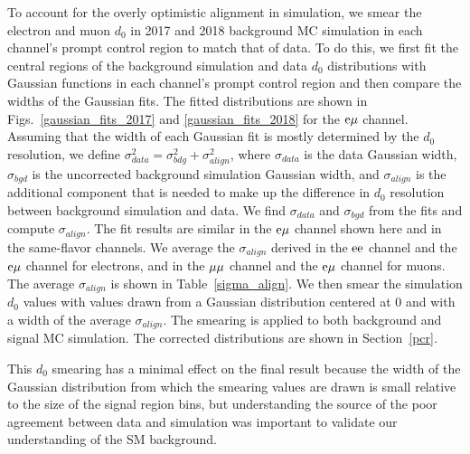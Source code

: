 To account for the overly optimistic alignment in simulation, we smear the electron and muon $d_0$ in 2017 and 2018 background MC simulation in each channel's prompt control region to match that of data. To do this, we first fit the central regions of the background simulation and data $d_0$ distributions with Gaussian functions in each channel's prompt control region and then compare the widths of the Gaussian fits. The fitted distributions are shown in Figs.~\ref{gaussian_fits_2017} and \ref{gaussian_fits_2018} for the $\mathrm{e}{\mu}$ channel. Assuming that the width of each Gaussian fit is mostly determined by the $d_0$ resolution, we define $\sigma_{data}^2 = \sigma_{bdg}^2 + \sigma_{align}^2$, where $\sigma_{data}$ is the data Gaussian width, $\sigma_{bgd}$ is the uncorrected background simulation Gaussian width, and $\sigma_{align}$ is the additional component that is needed to make up the difference in $d_0$ resolution between background simulation and data. We find $\sigma_{data}$ and $\sigma_{bgd}$ from the fits and compute $\sigma_{align}$. The fit results are similar in the $\mathrm{e}{\mu}$ channel shown here and in the same-flavor channels. We average the $\sigma_{align}$ derived in the $\mathrm{e}\mathrm{e}$ channel and the $\mathrm{e}{\mu}$ channel for electrons, and in the ${\mu}{\mu}$ channel and the $\mathrm{e}{\mu}$ channel for muons. The average $\sigma_{align}$ is shown in Table~\ref{sigma_align}. We then smear the simulation $d_0$ values with values drawn from a Gaussian distribution centered at 0 and with a width of the average $\sigma_{align}$. The smearing is applied to both background and signal MC simulation. The corrected \ad distributions are shown in Section~\ref{pcr}.




This $d_0$ smearing has a minimal effect on the final result because the width of the Gaussian distribution from which the smearing values are drawn is small relative to the size of the signal region bins, but understanding the source of the poor agreement between data and simulation was important to validate our understanding of the SM background.

